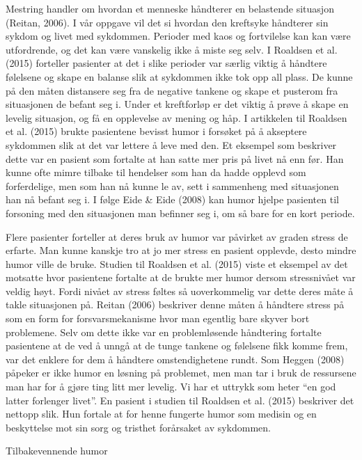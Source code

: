 Mestring handler om hvordan et menneske håndterer en belastende situasjon
(Reitan, 2006). I vår oppgave vil det si hvordan den kreftsyke håndterer sin
sykdom og livet med sykdommen.  Perioder med kaos og fortvilelse kan kan være
utfordrende, og det kan være vanskelig ikke å miste seg selv. I Roaldsen et al.
(2015) forteller pasienter at det i slike perioder var særlig viktig å håndtere
følelsene og skape en balanse slik at sykdommen ikke tok opp all plass. De
kunne på den måten distansere seg fra de negative tankene og skape et pusterom
fra situasjonen de befant seg i. Under et kreftforløp er det viktig å prøve å
skape en levelig situasjon, og få en opplevelse av mening og håp. I artikkelen
til Roaldsen et al. (2015) brukte pasientene bevisst humor i forsøket på å
akseptere sykdommen slik at det var lettere å leve med den. Et eksempel som
beskriver dette var en pasient som fortalte at han satte mer pris på livet nå
enn før. Han kunne ofte mimre tilbake til hendelser som han da hadde opplevd
som forferdelige, men som han nå kunne le av, sett i sammenheng med situasjonen
han nå befant seg i. I følge Eide \&{} Eide (2008) kan humor hjelpe pasienten til
forsoning med den situasjonen man befinner seg i, om så bare for en kort
periode.

Flere pasienter forteller at deres bruk av humor var påvirket av graden stress
de erfarte. Man kunne kanskje tro at jo mer stress en pasient opplevde, desto
mindre humor ville de bruke. Studien til Roaldsen et al. (2015) viste et
eksempel av det motsatte hvor pasientene fortalte at de brukte mer humor dersom
stressnivået var veldig høyt. Fordi nivået av stress føltes så uoverkommelig
var dette deres måte å takle situasjonen på. Reitan (2006) beskriver denne
måten å håndtere stress på som en form for forsvarsmekanisme hvor man egentlig
bare skyver bort problemene. Selv om dette ikke var en problemløsende
håndtering fortalte pasientene at de ved å unngå at de tunge tankene og
følelsene fikk komme frem, var det enklere for dem å håndtere omstendighetene
rundt. Som Heggen (2008) påpeker er ikke humor en løsning på problemet, men man
tar i bruk de ressursene man har for å gjøre ting litt mer levelig. Vi har et
uttrykk som heter “en god latter forlenger livet”. En pasient i studien til
Roaldsen et al. (2015) beskriver det nettopp slik. Hun fortale at for henne
fungerte humor som medisin og en beskyttelse mot sin sorg og tristhet
forårsaket av sykdommen.

Tilbakevennende humor

